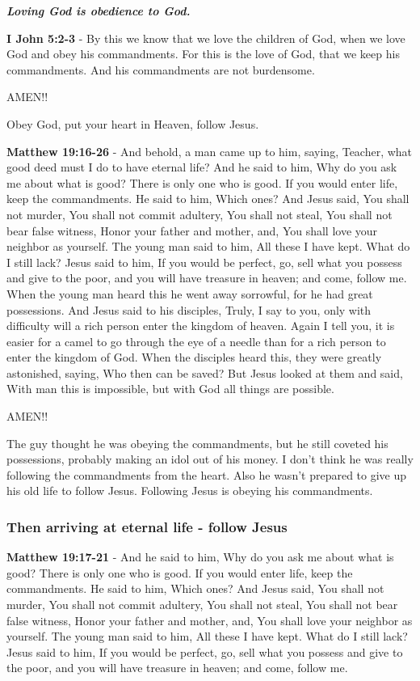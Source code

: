 \documentclass[11pt]{article}
\begin{document}
\emph{\textbf{Loving God is obedience to God.}}

\textbf{I John 5:2-3} - By this we know that we love the children of God, when we love God and obey his commandments. For this is the love of God, that we keep his commandments. And his commandments are not burdensome.

AMEN!!

Obey God, put your heart in Heaven, follow Jesus.

\textbf{Matthew 19:16-26} - And behold, a man came up to him, saying, Teacher, what good deed must I do to have eternal life? And he said to him, Why do you ask me about what is good? There is only one who is good. If you would enter life, keep the commandments. He said to him, Which ones? And Jesus said, You shall not murder, You shall not commit adultery, You shall not steal, You shall not bear false witness, Honor your father and mother, and, You shall love your neighbor as yourself. The young man said to him, All these I have kept. What do I still lack? Jesus said to him, If you would be perfect, go, sell what you possess and give to the poor, and you will have treasure in heaven; and come, follow me. When the young man heard this he went away sorrowful, for he had great possessions. And Jesus said to his disciples, Truly, I say to you, only with difficulty will a rich person enter the kingdom of heaven. Again I tell you, it is easier for a camel to go through the eye of a needle than for a rich person to enter the kingdom of God. When the disciples heard this, they were greatly astonished, saying, Who then can be saved? But Jesus looked at them and said, With man this is impossible, but with God all things are possible.

AMEN!!

The guy thought he was obeying the commandments, but he still coveted his possessions, probably making an idol out of his money.
I don't think he was really following the commandments from the heart.
Also he wasn't prepared to give up his old life to follow Jesus.
Following Jesus is obeying his commandments.

\subsubsection{Then arriving at eternal life - follow Jesus}
\label{sec:org3ba0142}
\textbf{Matthew 19:17-21} - And he said to him, Why do you ask me about what is good? There is only one who is good. If you would enter life, keep the commandments. He said to him, Which ones? And Jesus said, You shall not murder, You shall not commit adultery, You shall not steal, You shall not bear false witness, Honor your father and mother, and, You shall love your neighbor as yourself. The young man said to him, All these I have kept. What do I still lack? Jesus said to him, If you would be perfect, go, sell what you possess and give to the poor, and you will have treasure in heaven; and come, follow me.
\end{document}
